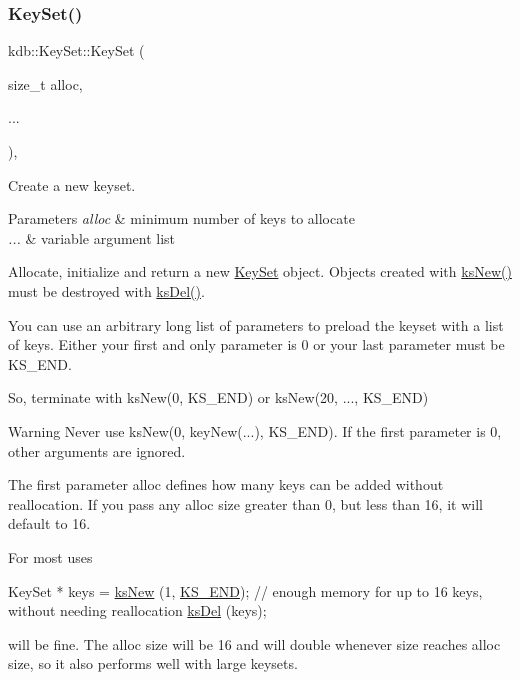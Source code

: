 \subsubsection{\texorpdfstring{Key\+Set()}{KeySet()}\hspace{0.1cm}{\footnotesize\ttfamily [4/5]}}
{\footnotesize\ttfamily kdb\+::\+Key\+Set\+::\+Key\+Set (\begin{DoxyParamCaption}\item[{size\+\_\+t}]{alloc,  }\item[{}]{... }\end{DoxyParamCaption})\hspace{0.3cm}{\ttfamily [inline]}, {\ttfamily [explicit]}}



Create a new keyset. 


\begin{DoxyParams}{Parameters}
{\em alloc} & minimum number of keys to allocate \\
\hline
{\em ...} & variable argument list\\
\hline
\end{DoxyParams}
Allocate, initialize and return a new \hyperlink{classkdb_1_1KeySet}{Key\+Set} object. Objects created with \hyperlink{group__keyset_ga671e1aaee3ae9dc13b4834a4ddbd2c3c}{ks\+New()} must be destroyed with \hyperlink{group__keyset_ga27e5c16473b02a422238c8d970db7ac8}{ks\+Del()}.

You can use an arbitrary long list of parameters to preload the keyset with a list of keys. Either your first and only parameter is 0 or your last parameter must be K\+S\+\_\+\+E\+ND.

So, terminate with ks\+New(0, K\+S\+\_\+\+E\+N\+D) or ks\+New(20, ..., K\+S\+\_\+\+E\+ND)

\begin{DoxyWarning}{Warning}
Never use ks\+New(0, key\+New(...), K\+S\+\_\+\+E\+ND). If the first parameter is 0, other arguments are ignored.
\end{DoxyWarning}
The first parameter {\ttfamily alloc} defines how many keys can be added without reallocation. If you pass any alloc size greater than 0, but less than 16, it will default to 16.

For most uses


\begin{DoxyCodeInclude}
KeySet * keys = \hyperlink{group__keyset_ga671e1aaee3ae9dc13b4834a4ddbd2c3c}{ksNew} (1, \hyperlink{group__keyset_ga7a28fce3773b2c873c94ac80b8b4cd54}{KS\_END});
\textcolor{comment}{// enough memory for up to 16 keys, without needing reallocation}
\hyperlink{group__keyset_ga27e5c16473b02a422238c8d970db7ac8}{ksDel} (keys);
\end{DoxyCodeInclude}
 will be fine. The alloc size will be 16 and will double whenever size reaches alloc size, so it also performs well with large keysets.

